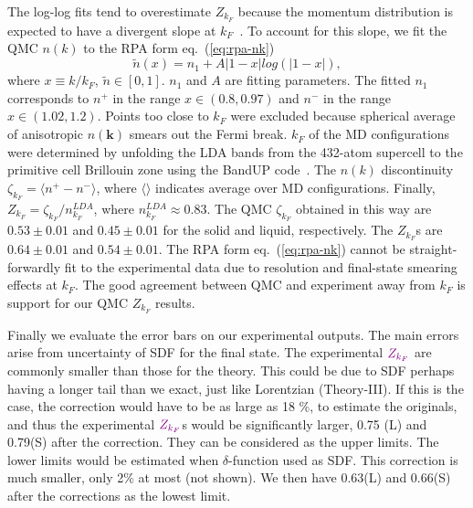 \documentclass[twocolumn,showpacs,showkeys,fleqn,prl,superscriptaddress]{revtex4}%
\begin{document}
\vspace{10mm}

The log-log fits tend to overestimate $Z_{k_F}$ because the momentum distribution is expected to have a divergent slope at $k_F$~\cite{gg02}. To account for this slope, we fit the QMC $n(k)$ to the RPA form eq.~(\ref{eq:rpa-nk})
\begin{equation} \label{eq:rpa-nk}
\tilde{n}(x) = n_1 + A\vert 1-x\vert log\left(\vert 1-x\vert\right),
\end{equation}
where $x\equiv k/k_F$, $\tilde{n}\in[0,1]$. $n_1$ and $A$ are fitting parameters. The fitted $n_1$ corresponds to $n^+$ in the range $x\in(0.8, 0.97)$ and $n^-$ in the range $x\in(1.02, 1.2)$. Points too close to $k_F$ were excluded because spherical average of anisotropic $n(\boldsymbol{k})$ smears out the Fermi break. $k_F$ of the MD configurations were determined by unfolding the LDA bands from the 432-atom supercell to the primitive cell Brillouin zone using the BandUP code~\cite{Medeiros2014,Medeiros2015}. The $n(k)$ discontinuity $\zeta_{k_F}= \langle n^+-n^-\rangle$, where $\langle\rangle$ indicates average over MD configurations. Finally, $Z_{k_F} = \zeta_{k_F}/n_{k_F}^{LDA}$, where $n_{k_F}^{LDA}\approx0.83$. The QMC $\zeta_{k_F}$ obtained in this way are $0.53\pm0.01$ and $0.45\pm0.01$ for the solid and liquid, respectively. The $Z_{k_F}$s are $0.64\pm0.01$ and $0.54\pm0.01$.
The RPA form eq.~(\ref{eq:rpa-nk}) cannot be straight-forwardly fit to the experimental data due to resolution and final-state smearing effects at $k_F$. The good agreement between QMC and experiment away from $k_F$ is support for our QMC $Z_{k_F}$ results.

\vspace{10mm}

Finally we evaluate the error bars on our experimental outputs.
The main errors arise from uncertainty of SDF for the final state.
The experimental ${\color{violet}Z_{k_F}}$ are commonly smaller than those for the theory.
This could be due to SDF perhaps having a longer tail than we exact, just like Lorentzian (Theory-III). 
If this is the case, the correction would have to be as large as 18 \%, to estimate the originals, and thus the experimental ${\color{violet}Z_{k_F}}$s would be significantly larger, 0.75 (L) and 0.79(S) after the correction. 
They can be considered as the upper limits.
The lower limits would be estimated when $\delta$-function used as SDF. This correction is much smaller, only 2\% at most (not shown).
We then have 0.63(L) and 0.66(S) after the corrections as the lowest limit.    
\end{document}
